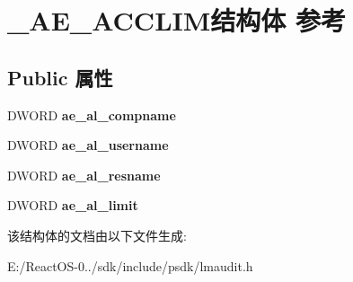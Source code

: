 \hypertarget{struct___a_e___a_c_c_l_i_m}{}\section{\+\_\+\+A\+E\+\_\+\+A\+C\+C\+L\+I\+M结构体 参考}
\label{struct___a_e___a_c_c_l_i_m}
\subsection*{Public 属性}
\begin{DoxyCompactItemize}
\item 
\mbox{\label{struct___a_e___a_c_c_l_i_m_a8e41824d50795e4539717a5f52b8db25}} 
D\+W\+O\+RD {\bfseries ae\+\_\+al\+\_\+compname}
\item 
\mbox{\label{struct___a_e___a_c_c_l_i_m_a8f68337e8176bb74911c67d9b45bf1c3}} 
D\+W\+O\+RD {\bfseries ae\+\_\+al\+\_\+username}
\item 
\mbox{\label{struct___a_e___a_c_c_l_i_m_a21d40a35d5a593fbbc38371716fe12c5}} 
D\+W\+O\+RD {\bfseries ae\+\_\+al\+\_\+resname}
\item 
\mbox{\label{struct___a_e___a_c_c_l_i_m_a146b579716763f0d6f917d6c75bf8728}} 
D\+W\+O\+RD {\bfseries ae\+\_\+al\+\_\+limit}
\end{DoxyCompactItemize}


该结构体的文档由以下文件生成\+:\begin{DoxyCompactItemize}
\item 
E\+:/\+React\+O\+S-\/0../sdk/include/psdk/lmaudit.\+h\end{DoxyCompactItemize}
